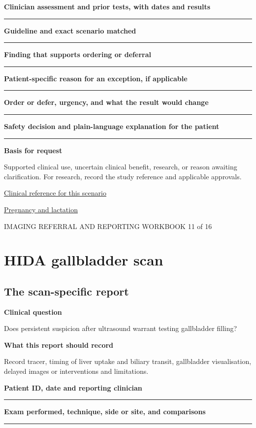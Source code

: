 \documentclass[11pt,a4paper]{article}
\newcommand{\record}[1]{\textbf{#1}\par\vspace{0.55\baselineskip}\hrule\vspace{0.35\baselineskip}}
\begin{document}
\record{Clinician assessment and prior tests, with dates and results}

\record{Guideline and exact scenario matched}

\record{Finding that supports ordering or deferral}

\record{Patient-specific reason for an exception, if applicable}

\record{Order or defer, urgency, and what the result would change}

\record{Safety decision and plain-language explanation for the patient}

\textbf{Basis for request}\par Supported clinical use, uncertain clinical benefit, research, or reason awaiting clarification. For research, record the study reference and applicable approvals.\par

\small\href{https://www.radiologyinfo.org/en/info/acs-right-upper-quadrant-pain}{Clinical reference for this scenario}

\quad\href{https://pubmed.ncbi.nlm.nih.gov/28937575/}{Pregnancy and lactation}

\normalsize

\newpage

{\small IMAGING REFERRAL AND REPORTING WORKBOOK \hfill 11 of 16}

\section*{HIDA gallbladder scan}

\subsection*{The scan-specific report}

\textbf{Clinical question}\par Does persistent suspicion after ultrasound warrant testing gallbladder filling?\par

\textbf{What this report should record}\par Record tracer, timing of liver uptake and biliary transit, gallbladder visualisation, delayed images or interventions and limitations.\par

\record{Patient ID, date and reporting clinician}

\record{Exam performed, technique, side or site, and comparisons}
\end{document}
